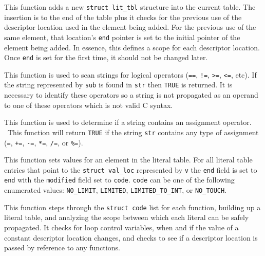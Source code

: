 This function adds a new \texttt{struct lit\_tbl} structure into the current
table. The insertion is to the end of the table plus it checks for the
previous use of the descriptor location used in the element being
added. For the previous use of the same element, that location's
\texttt{end} pointer is set to the initial pointer of the element
being added. In essence, this defines a scope for each descriptor
location. Once \texttt{end} is set for the first time, it should not
be changed later.


This function is used to scan strings for logical operators
(\texttt{==}, \texttt{!=}, \texttt{{\textgreater}=},
\texttt{{\textless}=}, etc). If the string represented by \texttt{sub}
is found in \texttt{str} then \texttt{TRUE} is returned. It is
necessary to identify these operators so a string is not propagated as
an operand to one of these operators which is not valid C syntax.


This function is used to determine if a string contains an assignment
operator. \ This function will return \texttt{TRUE} if the string
\texttt{str} contains any type of assignment (\texttt{=}, \texttt{+=},
\texttt{{}-=}, \texttt{*=}, \texttt{/=}, or \texttt{\%=}).



This function sets values for an element in the literal table. For all
literal table entries that point to the \texttt{struct val\_loc}
represented by \texttt{v} the \texttt{end} field is set to
\texttt{end} with the \texttt{modified} field set to
\texttt{code}. \texttt{code} can be one of the following enumerated
values: \texttt{NO\_LIMIT}, \texttt{LIMITED},
\texttt{LIMITED\_TO\_INT}, or \texttt{NO\_TOUCH}.



This function steps through the \texttt{struct code} list for each
function, building up a literal table, and analyzing the scope between
which each literal can be safely propagated. It checks for loop
control variables, when and if the value of a constant descriptor
location changes, and checks to see if a descriptor location is passed
by reference to any functions.



